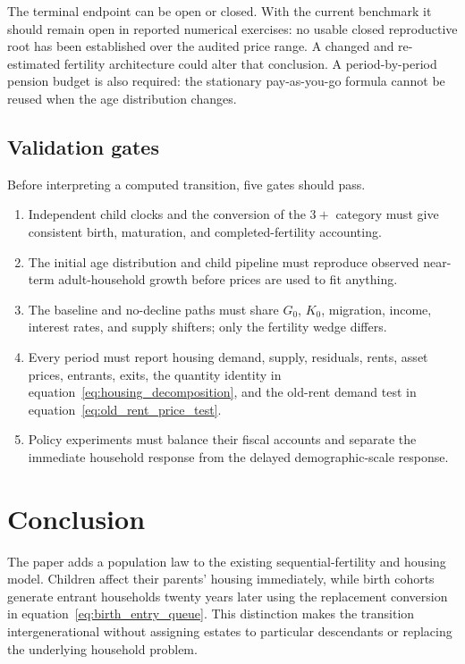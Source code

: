 \documentclass[11pt]{article}
\theoremstyle{definition}
\newcommand{\1}{\mathbf 1}
\begin{document}
The terminal endpoint can be open or closed. With the current benchmark it
should remain open in reported numerical exercises: no usable closed
reproductive root has been established over the audited price range. A changed
and re-estimated fertility architecture could alter that conclusion. A
period-by-period pension budget is also
required: the stationary pay-as-you-go formula cannot be reused when the age
distribution changes.

\subsection{Validation gates}

Before interpreting a computed transition, five gates should pass.
\begin{enumerate}
 \item Independent child clocks and the conversion of the $3+$ category must
 give consistent birth, maturation, and completed-fertility accounting.
 \item The initial age distribution and child pipeline must reproduce observed
 near-term adult-household growth before prices are used to fit anything.
 \item The baseline and no-decline paths must share $G_0$, $K_0$, migration,
 income, interest rates, and supply shifters; only the fertility wedge differs.
 \item Every period must report housing demand, supply, residuals, rents,
 asset prices, entrants, exits, the quantity identity in
 equation~\eqref{eq:housing_decomposition}, and the old-rent demand test in
 equation~\eqref{eq:old_rent_price_test}.
 \item Policy experiments must balance their fiscal accounts and separate the
 immediate household response from the delayed demographic-scale response.
\end{enumerate}

\fi

\section{Conclusion}

The paper adds a population law to the existing sequential-fertility and
housing model. Children affect their parents' housing immediately, while birth
cohorts generate entrant households twenty years later using the replacement
conversion in equation~\eqref{eq:birth_entry_queue}. This distinction makes the transition
intergenerational without assigning estates to particular descendants or
replacing the underlying household problem.
\end{document}

